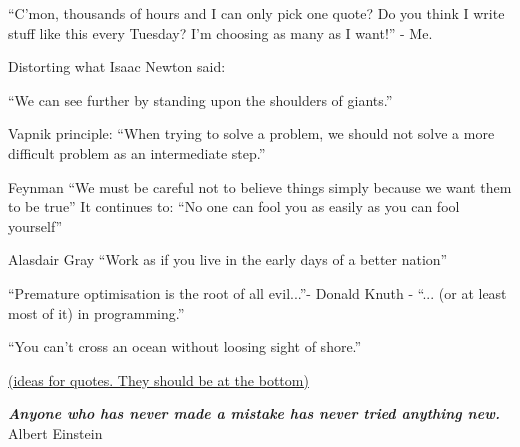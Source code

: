 ``C'mon, thousands of hours and I can only pick one quote? Do you think I write stuff like this every Tuesday? I'm choosing as many as I want!'' - Me.


Distorting what Isaac Newton said:

``We can see further by standing upon the shoulders of giants.''

Vapnik principle:
``When trying to solve a problem, we should not solve a more difficult problem as an intermediate step.''

Feynman
``We must be careful not to believe things simply because we want them to be true''
It continues to: ``No one can fool you as easily as you can fool yourself''

Alasdair Gray
``Work as if you live in the early days of a better nation''


``Premature optimisation is the root of all evil...''- Donald Knuth - ``... (or at least most of it) in programming.''


``You can't cross an ocean without loosing sight of shore.''



\ul{(ideas for quotes. They should be at the bottom)}


\thispagestyle{empty}
\hbox{} \vfill
\begin{flushright}
\small \textit{\textbf{Anyone who has never made a mistake has never tried anything new.}}
\\ \vspace{2mm}  
\scriptsize Albert Einstein
\end{flushright}

\clearpage
\thispagestyle{empty}
\cleardoublepage

